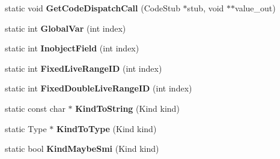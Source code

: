 \begin{DoxyCompactItemize}
\item 
static void {\bfseries Get\+Code\+Dispatch\+Call} (Code\+Stub $\ast$stub, void $\ast$$\ast$value\+\_\+out)\hypertarget{classv8_1_1internal_1_1_b_a_s_e___e_m_b_e_d_d_e_d_a4a70a54cf156a3c0393d1b78ce60e8bf}{}\label{classv8_1_1internal_1_1_b_a_s_e___e_m_b_e_d_d_e_d_a4a70a54cf156a3c0393d1b78ce60e8bf}

\item 
static int {\bfseries Global\+Var} (int index)\hypertarget{classv8_1_1internal_1_1_b_a_s_e___e_m_b_e_d_d_e_d_aadc67aa64f4700324126b3d4fb4d1176}{}\label{classv8_1_1internal_1_1_b_a_s_e___e_m_b_e_d_d_e_d_aadc67aa64f4700324126b3d4fb4d1176}

\item 
static int {\bfseries Inobject\+Field} (int index)\hypertarget{classv8_1_1internal_1_1_b_a_s_e___e_m_b_e_d_d_e_d_a894902b30d0b8791f706286f2a33f6c0}{}\label{classv8_1_1internal_1_1_b_a_s_e___e_m_b_e_d_d_e_d_a894902b30d0b8791f706286f2a33f6c0}

\item 
static int {\bfseries Fixed\+Live\+Range\+ID} (int index)\hypertarget{classv8_1_1internal_1_1_b_a_s_e___e_m_b_e_d_d_e_d_a7cecbee78a10e7910101629ac3d42cff}{}\label{classv8_1_1internal_1_1_b_a_s_e___e_m_b_e_d_d_e_d_a7cecbee78a10e7910101629ac3d42cff}

\item 
static int {\bfseries Fixed\+Double\+Live\+Range\+ID} (int index)\hypertarget{classv8_1_1internal_1_1_b_a_s_e___e_m_b_e_d_d_e_d_a26750c238b1824da322a70a7ce94f081}{}\label{classv8_1_1internal_1_1_b_a_s_e___e_m_b_e_d_d_e_d_a26750c238b1824da322a70a7ce94f081}

\item 
static const char $\ast$ {\bfseries Kind\+To\+String} (Kind kind)\hypertarget{classv8_1_1internal_1_1_b_a_s_e___e_m_b_e_d_d_e_d_abac003627221c504e82c029eb5ef072e}{}\label{classv8_1_1internal_1_1_b_a_s_e___e_m_b_e_d_d_e_d_abac003627221c504e82c029eb5ef072e}

\item 
static Type $\ast$ {\bfseries Kind\+To\+Type} (Kind kind)\hypertarget{classv8_1_1internal_1_1_b_a_s_e___e_m_b_e_d_d_e_d_a71d482ebf75125f84fa627e7a60b9e4b}{}\label{classv8_1_1internal_1_1_b_a_s_e___e_m_b_e_d_d_e_d_a71d482ebf75125f84fa627e7a60b9e4b}

\item 
static bool {\bfseries Kind\+Maybe\+Smi} (Kind kind)\hypertarget{classv8_1_1internal_1_1_b_a_s_e___e_m_b_e_d_d_e_d_a268cc3cee90e4a10cf8ac1e8ba6c650e}{}\label{classv8_1_1internal_1_1_b_a_s_e___e_m_b_e_d_d_e_d_a268cc3cee90e4a10cf8ac1e8ba6c650e}


\end{DoxyCompactItemize}
